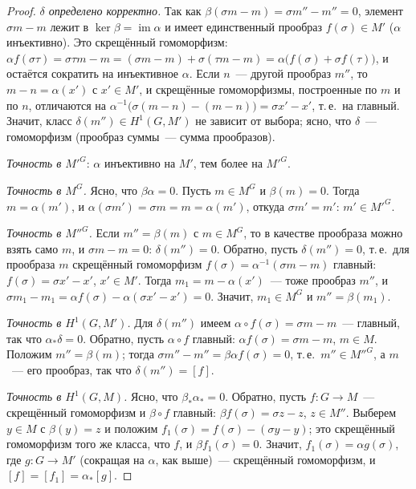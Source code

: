 \begin{proof}
\emph{$\delta$ определено корректно.} Так как $\beta(\sigma m-m)=\sigma m''-m''=0$, элемент $\sigma m-m$ лежит в
$\ker\beta=\operatorname{im}\alpha$ и имеет единственный прообраз $f(\sigma)\in M'$ ($\alpha$ инъективно). Это скрещённый
гомоморфизм: $\alpha f(\sigma\tau)=\sigma\tau m-m=(\sigma m-m)+\sigma(\tau m-m)=\alpha\bigl(f(\sigma)+\sigma f(\tau)\bigr)$,
и остаётся сократить на инъективное $\alpha$. Если $n$~--- другой прообраз $m''$, то $m-n=\alpha(x')$ с $x'\in M'$, и
скрещённые гомоморфизмы, построенные по $m$ и по $n$, отличаются на $\alpha^{-1}\bigl(\sigma(m-n)-(m-n)\bigr)=\sigma
x'-x'$, т.\,е.\ на главный. Значит, класс $\delta(m'')\in H^1(G,M')$ не зависит от выбора; ясно, что $\delta$~--- гомоморфизм
(прообраз суммы~--- сумма прообразов).

\emph{Точность в $M'^G$}: $\alpha$ инъективно на $M'$, тем более на $M'^G$.

\emph{Точность в $M^G$.} Ясно, что $\beta\alpha=0$. Пусть $m\in M^G$ и $\beta(m)=0$. Тогда $m=\alpha(m')$, и
$\alpha(\sigma m')=\sigma m=m=\alpha(m')$, откуда $\sigma m'=m'$: $m'\in M'^G$.

\emph{Точность в $M''^G$.} Если $m''=\beta(m)$ с $m\in M^G$, то в качестве прообраза можно взять само $m$, и $\sigma
m-m=0$: $\delta(m'')=0$. Обратно, пусть $\delta(m'')=0$, т.\,е.\ для прообраза $m$ скрещённый гомоморфизм
$f(\sigma)=\alpha^{-1}(\sigma m-m)$ главный: $f(\sigma)=\sigma x'-x'$, $x'\in M'$. Тогда $m_1=m-\alpha(x')$~--- тоже
прообраз $m''$, и $\sigma m_1-m_1=\alpha f(\sigma)-\alpha(\sigma x'-x')=0$. Значит, $m_1\in M^G$ и $m''=\beta(m_1)$.

\emph{Точность в $H^1(G,M')$.} Для $\delta(m'')$ имеем $\alpha\circ f(\sigma)=\sigma m-m$~--- главный, так что
$\alpha_*\delta=0$. Обратно, пусть $\alpha\circ f$ главный: $\alpha f(\sigma)=\sigma m-m$, $m\in M$. Положим
$m''=\beta(m)$; тогда $\sigma m''-m''=\beta\alpha f(\sigma)=0$, т.\,е.\ $m''\in M''^G$, а $m$~--- его прообраз, так что
$\delta(m'')=[f]$.

\emph{Точность в $H^1(G,M)$.} Ясно, что $\beta_*\alpha_*=0$. Обратно, пусть $f\colon G\to M$~--- скрещённый
гомоморфизм и $\beta\circ f$ главный: $\beta f(\sigma)=\sigma z-z$, $z\in M''$. Выберем $y\in M$ с $\beta(y)=z$ и положим
$f_1(\sigma)=f(\sigma)-(\sigma y-y)$; это скрещённый гомоморфизм того же класса, что $f$, и $\beta f_1(\sigma)=0$. Значит,
$f_1(\sigma)=\alpha g(\sigma)$, где $g\colon G\to M'$ (сокращая на $\alpha$, как выше)~--- скрещённый гомоморфизм, и
$[f]=[f_1]=\alpha_*[g]$.
\end{proof}

